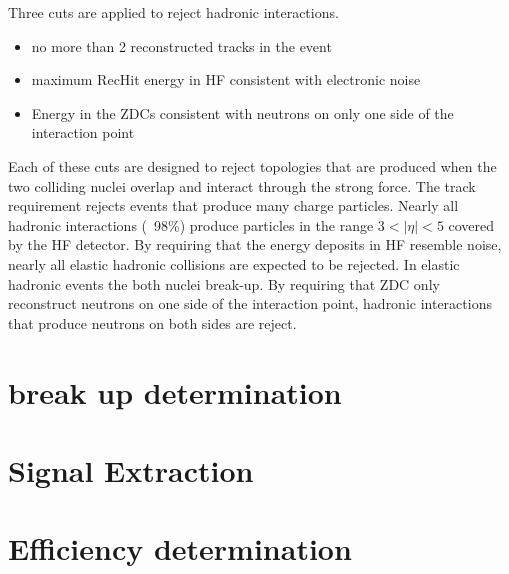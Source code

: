    Three cuts are applied to reject hadronic interactions. 
    \begin{itemize}
	    \item no more than 2 reconstructed tracks in the event
	    \item maximum RecHit energy in HF consistent with electronic noise 
	    \item Energy in the ZDCs consistent with neutrons on only one side 
		    of the interaction point
    \end{itemize}
    Each of these cuts are designed to reject topologies that are produced when
      the two colliding nuclei overlap and interact through the strong force. 
    The track requirement rejects events that produce many charge particles.
    Nearly all hadronic interactions (~98\%) produce particles in the 
      range $3<|\eta|<5$ covered by the HF detector.
    By requiring that the energy deposits in HF resemble noise, nearly all
      elastic hadronic collisions are expected to be rejected.
    In elastic hadronic events the both nuclei break-up. 
    By requiring that ZDC only reconstruct neutrons on one side of the 
      interaction point, hadronic interactions that produce neutrons on both 
      sides are reject.

  \section{break up determination}
  \section{Signal Extraction}
  \section{Efficiency determination}
